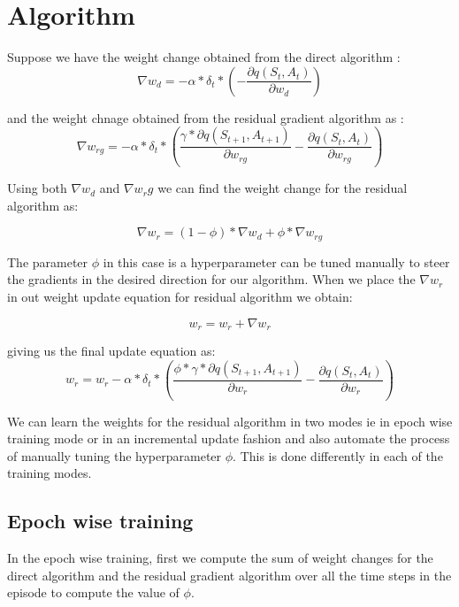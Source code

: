 \documentclass[fleqn]{article}
\begin{document}
\section*{Algorithm}
Suppose we have the weight change obtained from the direct algorithm :
\begin{equation}
\nabla w_d = -\alpha * \delta_{t} * (-\frac{\partial q(S_t, A_t)}{\partial w_d})
\end{equation}

and the weight chnage obtained from the residual gradient algorithm as :
\begin{equation}
\nabla w_{rg} = -\alpha * \delta_{t} * (\frac{ \gamma * \partial q(S_{t+1}, A_{t+1})}{\partial w_{rg}}-\frac{\partial q(S_t, A_t)}{\partial w_{rg}})
\end{equation}

Using both $\nabla w_d$ and $\nabla w_rg$ we can find the weight change for the residual algorithm as:

\begin{equation}
\nabla w_r = (1-\phi)*\nabla w_d + \phi * \nabla w_{rg}
\end{equation}

The parameter $\phi$ in this case is a hyperparameter can be tuned manually to steer the gradients in the desired direction for our algorithm. When we place the $\nabla w_r$ in out weight update equation for residual algorithm we obtain:

\begin{equation}
w_r = w_r + \nabla w_r
\end{equation}

giving us the final update equation as:
\begin{equation}
w_r = w_r -\alpha * \delta_{t} * (\frac{ \phi * \gamma * \partial q(S_{t+1}, A_{t+1})}{\partial w_r}-\frac{\partial q(S_t, A_t)}{\partial w_r})
\end{equation}

We can learn the weights for the residual algorithm in two modes ie in epoch wise training mode or in an incremental update fashion and also automate the process of manually tuning the hyperparameter $\phi$. This is done differently in each of the training modes. 

\subsection*{Epoch wise training}
In the epoch wise training, first we compute the sum of weight changes for the direct algorithm and the residual gradient algorithm over all the time steps in the episode to compute the value of $\phi$.
\end{document}
